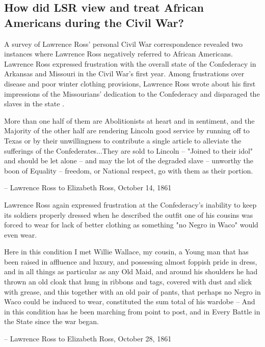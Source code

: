 \documentclass[12pt]{article}
\begin{document}
\subsection{How did LSR view and treat African Americans during the Civil War?}
A survey of Lawrence Ross' personal Civil War correspondence revealed two instances where Lawrence Ross negatively referred to African Americans. Lawrence Ross expressed frustration with the overall state of the Confederacy in Arkansas and Missouri in the Civil War's first year. Among frustrations over disease and poor winter clothing provisions, Lawrence Ross wrote about his first impressions of the Missourians' dedication to the Confederacy and disparaged the slaves in the state \cite[pg. 13-14]{sullyletters}.
\begin{displayquote}
More than one half of them are Abolitionists at heart and in sentiment, and the Majority of the other half are rendering Lincoln good service by running off to Texas or by their unwillingness to contribute a single article to alleviate the sufferings of the Confederates...They are sold to Lincoln -- "Joined to their idol" and should be let alone -- and may the lot of the degraded slave -- unworthy the boon of Equality -- freedom, or National respect, go with them as their portion.

-- Lawrence Ross to Elizabeth Ross, October 14, 1861 \cite[pg. 14]{sullyletters} 

\end{displayquote} 

Lawrence Ross again expressed frustration at the Confederacy's inability to keep its soldiers properly dressed when he described the outfit one of his cousins was forced to wear for lack of better clothing as something "no Negro in Waco" would even wear.
\begin{displayquote}
Here in this condition I met Willie Wallace, my cousin, a Young man that has been raised in affluence and luxury, and possessing almost foppish pride in dress, and in all things as particular as any Old Maid, and around his shoulders he had thrown an old cloak that hung in ribbons and tags, covered with dust and slick with grease, and this together with an old pair of pants, that perhaps no Negro in Waco could be induced to wear, constituted the sum total of his wardobe -- And in this condition has he been marching from point to post, and in Every Battle in the State since the war began.

-- Lawrence Ross to Elizabeth Ross, October 28, 1861 \cite[pg. 16]{sullyletters}
\end{displayquote}
\end{document}
